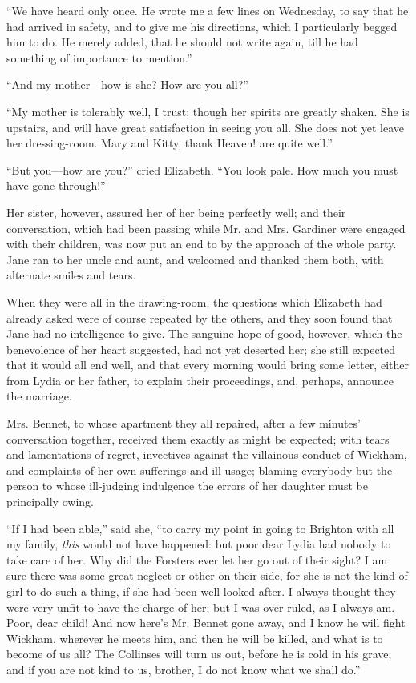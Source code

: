 ``We have heard only once. He wrote me a few lines on Wednesday, to say that he had arrived in safety, and to give me his directions, which I particularly begged him to do. He merely added, that he should not write again, till he had something of importance to mention.''

``And my mother---how is she? How are you all?''

``My mother is tolerably well, I trust; though her spirits are greatly shaken. She is upstairs, and will have great satisfaction in seeing you all. She does not yet leave her dressing-room. Mary and Kitty, thank Heaven! are quite well.''

``But you---how are you?'' cried Elizabeth. ``You look pale. How much you must have gone through!''

Her sister, however, assured her of her being perfectly well; and their conversation, which had been passing while Mr. and Mrs. Gardiner were engaged with their children, was now put an end to by the approach of the whole party. Jane ran to her uncle and aunt, and welcomed and thanked them both, with alternate smiles and tears.

When they were all in the drawing-room, the questions which Elizabeth had already asked were of course repeated by the others, and they soon found that Jane had no intelligence to give. The sanguine hope of good, however, which the benevolence of her heart suggested, had not yet deserted her; she still expected that it would all end well, and that every morning would bring some letter, either from Lydia or her father, to explain their proceedings, and, perhaps, announce the marriage.

Mrs. Bennet, to whose apartment they all repaired, after a few minutes' conversation together, received them exactly as might be expected; with tears and lamentations of regret, invectives against the villainous conduct of Wickham, and complaints of her own sufferings and ill-usage; blaming everybody but the person to whose ill-judging indulgence the errors of her daughter must be principally owing.

``If I had been able,'' said she, ``to carry my point in going to Brighton with all my family, \textit{this} would not have happened: but poor dear Lydia had nobody to take care of her. Why did the Forsters ever let her go out of their sight? I am sure there was some great neglect or other on their side, for she is not the kind of girl to do such a thing, if she had been well looked after. I always thought they were very unfit to have the charge of her; but I was over-ruled, as I always am. Poor, dear child! And now here's Mr. Bennet gone away, and I know he will fight Wickham, wherever he meets him, and then he will be killed, and what is to become of us all? The Collinses will turn us out, before he is cold in his grave; and if you are not kind to us, brother, I do not know what we shall do.''

